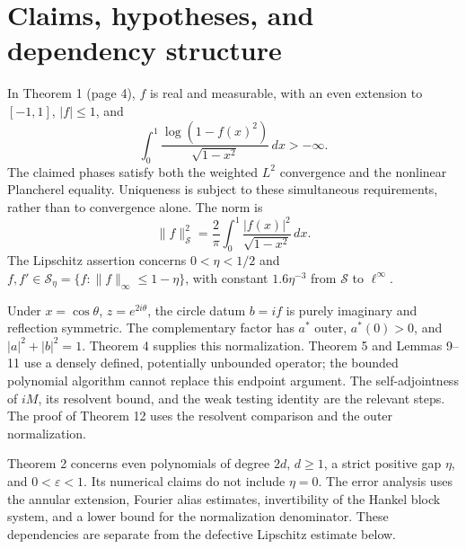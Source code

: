 \documentclass[10pt]{article}
\begin{document}
\section*{Claims, hypotheses, and dependency structure}
In Theorem 1 (page 4), \(f\) is real and measurable, with an even extension to \([-1,1]\), \(|f|\leq1\), and \[\int_0^1\frac{\log(1-f(x)^2)}{\sqrt{1-x^2}}\,dx>-\infty.\] The claimed phases satisfy both the weighted \(L^2\) convergence and the nonlinear Plancherel equality. Uniqueness is subject to these simultaneous requirements, rather than to convergence alone. The norm is \[\|f\|_{\mathcal S}^2=\frac2\pi\int_0^1
       \frac{|f(x)|^2}{\sqrt{1-x^2}}\,dx.\] The Lipschitz assertion concerns \(0<\eta<1/2\) and \(f,f'\in\mathcal S_\eta=\{f:\|f\|_\infty\leq1-\eta\}\), with constant \(1.6\eta^{-3}\) from \(\mathcal S\) to \(\ell^\infty\).\par
Under \(x=\cos\theta\), \(z=e^{2i\theta}\), the circle datum \(b=if\) is purely imaginary and reflection symmetric. The complementary factor has \(a^*\) outer, \(a^*(0)>0\), and \(|a|^2+|b|^2=1\). Theorem 4 supplies this normalization. Theorem 5 and Lemmas 9–11 use a densely defined, potentially unbounded operator; the bounded polynomial algorithm cannot replace this endpoint argument. The self-adjointness of \(iM\), its resolvent bound, and the weak testing identity are the relevant steps. The proof of Theorem 12 uses the resolvent comparison and the outer normalization.\par
Theorem 2 concerns even polynomials of degree \(2d\), \(d\geq1\), a strict positive gap \(\eta\), and \(0<\varepsilon<1\). Its numerical claims do not include \(\eta=0\). The error analysis uses the annular extension, Fourier alias estimates, invertibility of the Hankel block system, and a lower bound for the normalization denominator. These dependencies are separate from the defective Lipschitz estimate below.\par
\end{document}
